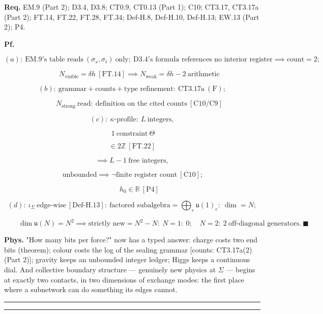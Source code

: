 \begin{theorem}
\textbf{Req.} EM.9 (Part 2); D3.4, D3.8; CT0.9, CT0.13 (Part 1); C10; CT3.17, CT3.17a (Part 2); FT.14, FT.22, FT.28, FT.34; Def-H.8, Def-H.10, Def-H.13; EW.13 (Part 2); P4.

\textbf{Pf.}

\[
(a):\ \mathrm{EM.9}'\text{s table reads}\ (\sigma_s,\sigma_t)\ \text{only};\ \mathrm{D3.4}'\text{s formula references no interior register}\implies\text{count}=2;
\]

\[
\qquad N_{\mathrm{visible}}=\delta h\ [\mathrm{FT.14}]\implies N_{\mathrm{weak}}=\delta h-2\ \text{arithmetic}
\]

\[
(b):\ \text{grammar}+\text{counts}+\text{type refinement}:\ \mathrm{CT3.17a}\ (\text{F});
\]

\[
\qquad N_{\mathrm{strong}}\ \text{read}:\ \text{definition on the cited counts}\ [\mathrm{C10}/\mathrm{C9}]
\]

\[
(c):\ \kappa\text{-profile}:\ L\ \text{integers},
\]

\[
\ 1\ \text{constraint}\ \Theta
\]

\[
\in 2\mathbb Z\ [\mathrm{FT.22}]
\]

\[
\implies L{-}1\ \text{free integers},
\]

\[
\ \text{unbounded}\implies\neg\text{finite register count}\ [\mathrm{C10}];
\]

\[
\qquad h_0\in\mathbb R\ [\mathrm{P4}]
\]

\[
(d):\ \iota_\Sigma\ \text{edge-wise}\ [\mathrm{Def\text{-}H.13}]:\ \text{factored subalgebra}=\bigoplus_e\mathfrak u(1)_e:\ \dim=N;
\]

\[
\qquad \dim\mathfrak u(N)=N^2\implies\text{strictly new}=N^2-N:\ N{=}1:\ 0;\quad N{=}2:\ 2\ \text{off-diagonal generators}.\ \blacksquare
\]

\textbf{Phys.} "How many bits per force?" now has a typed answer: charge costs two end bits (theorem); colour costs the log of the sealing grammar [counts: CT3.17a(2) (Part 2)]; gravity keeps an unbounded integer ledger; Higgs keeps a continuous dial. And collective boundary structure — genuinely new physics at $\Sigma$ — begins at exactly two contacts, in two dimensions of exchange modes: the first place where a subnetwork can do something its edges cannot.

\vspace{2pt}\noindent\rule{\textwidth}{0.4pt}\vspace{2pt}

\vspace{2pt}\noindent\rule{\textwidth}{0.4pt}\vspace{2pt}

\end{theorem}

